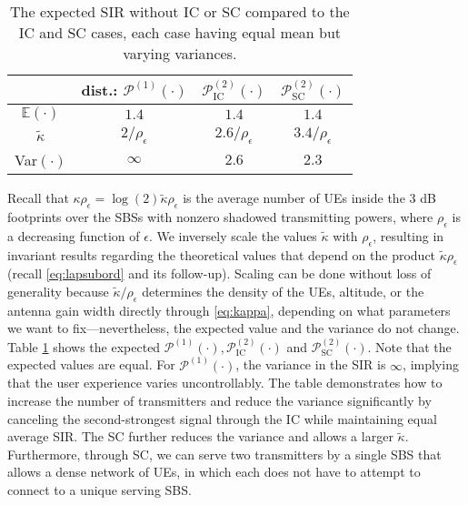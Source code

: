 \documentclass[lettersize,journal]{IEEEtran}
\begin{document}
\begin{table}[h]
  \begin{center}
    \caption{The expected SIR without IC or SC compared to the IC and SC cases, each case having equal mean but varying variances.}
    \label{table:tab1}
    \begin{tabular}{| c | c | c |c|}
      \hline
      & dist.: $\mathcal{P}^{(1)}(\cdot)$& $\mathcal{P}^{(2)}_{\text{IC}}(\cdot)$& $\mathcal{P}^{(2)}_{\text{SC}}(\cdot)$\\
      \hline
      $\mathbb{E}(\cdot)$&$1.4$ & $1.4$ &$1.4$\\ 
      \hline
      $\tilde{\kappa}$& $2/\rho_{\epsilon} $ &$2.6/\rho_{\epsilon}$& $3.4/\rho_{\epsilon}$\\
      \hline
      Var$(\cdot)$& $\infty$ & $2.6$ &$2.3$\\
      \hline 
    \end{tabular}
  \end{center}
\end{table}

Recall that $ \kappa \rho_{\epsilon}=\log(2)\tilde{\kappa} \rho_{\epsilon} $ is the average number of UEs inside the $3$ dB footprints over the SBSs with nonzero shadowed transmitting powers, where $\rho_{\epsilon}$ is a decreasing function of $\epsilon$. We inversely scale the values $\tilde{\kappa}$ with $\rho_{\epsilon}$, resulting in invariant results regarding the theoretical values that depend on the product $\tilde{\kappa} \rho_{\epsilon}$ (recall \eqref{eq:lapsubord} and its follow-up). Scaling can be done without loss of generality because $\tilde{\kappa}/\rho_{\epsilon}$ determines the density of the UEs, altitude, or the antenna gain width directly through \eqref{eq:kappa}, depending on what parameters we want to fix---nevertheless, the expected value and the variance do not change. Table \ref{table:tab1} shows the expected $\mathcal{P}^{(1)}(\cdot), \mathcal{P}^{(2)}_{\text{IC}}(\cdot) $ and $\mathcal{P}^{(2)}_{\text{SC}}(\cdot)$. Note that the expected values are equal. For $\mathcal{P}^{(1)}(\cdot)$, the variance in the SIR is $\infty$, implying that the user experience varies uncontrollably. The table demonstrates how to increase the number of transmitters and reduce the variance significantly by canceling the second-strongest signal through the IC while maintaining equal average SIR. The SC further reduces the variance and allows a larger $\tilde{\kappa}$. Furthermore, through SC, we can serve two transmitters by a single SBS that allows a dense network of UEs, in which each does not have to attempt to connect to a unique serving SBS. 
\end{document}
